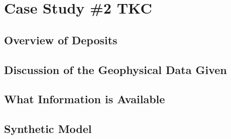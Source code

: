 
\chapter{Case Study \#2 TKC}
\label{ch:CaseStudy1}




\section{Overview of Deposits}
\label{sec:Overview of Deposits:TKC}
%
%
\section{Discussion of the Geophysical Data Given}
\label{sec:Discussion of the Geophysical Data Given:TKC}
%
%

\section{What Information is Available}
\label{sec:What Information is Available:TKC}

%
%

\section{Synthetic Model}
\label{sec:Synthetic Model:TKC}

%

